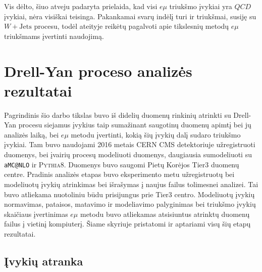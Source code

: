 \documentclass[a4paper, 12pt]{article}
\newcommand{\ttt}[1]{\texttt{#1}}
\newcommand{\emu}{e\mu}
\newcommand{\WJets}{W\! +\!\mathrm{Jets}}
\begin{document}
Vis dėlto, šiuo atveju padaryta prielaida, kad visi $\emu$ triukšmo įvykiai yra $QCD$ įvykiai, nėra visiškai teisinga.
Pakankamai svarų indėlį turi ir triukšmai, susiję su $\WJets$ procesu, todėl ateityje reikėtų pagalvoti apie tikslesnių
metodų $e\mu$ triukšmams įvertinti naudojimą.


\section{Drell-Yan proceso analizės rezultatai}

Pagrindinis šio darbo tikslas buvo iš didelių duomenų rinkinių atrinkti su Drell-Yan procesu siejamus įvykius taip
sumažinant saugotinų duomenų apimtį bei jų analizės laiką, bei $\emu$ metodu įvertinti, kokią šių įvykių dalį sudaro
triukšmo įvykiai.
Tam buvo naudojami 2016 metais CERN CMS detektoriuje užregistruoti duomenys, bei įvairių procesų modeliuoti duomenys,
daugiausia sumodeliuoti su \ttt{aMC@NLO} ir \textsc{Pythia8}.
Duomenys buvo saugomi Pietų Korėjos Tier3 duomenų centre.
Pradinis analizės etapas buvo eksperimento metu užregistruotų bei modeliuotų įvykių atrinkimas bei išrašymas į naujus
failus tolimesnei analizei.
Tai buvo atliekama nuotoliniu būdu prisijungus prie Tier3 centro.
Modeliuotų įvykių normavimas, pataisos, matavimo ir modeliavimo palyginimas bei triukšmo įvykių skaičiaus įvertinimas
$\emu$ metodu buvo atliekamas atsisiuntus atrinktų duomenų failus į vietinį kompiuterį.
Šiame skyriuje pristatomi ir aptariami visų šių etapų rezultatai.


\subsection{Įvykių atranka}
\end{document}
